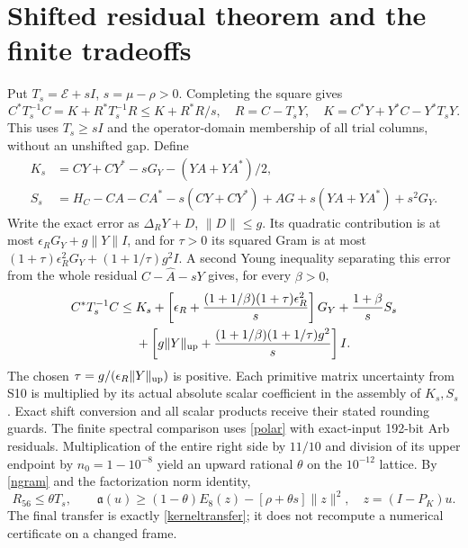 \documentclass[11pt]{article}
\numberwithin{equation}{section}
\begin{document}
\section{Shifted residual theorem and the finite tradeoffs}\label{tradeoffs}
Put $T_s=\mathcal E+sI$, $s=\mu-\rho>0$. Completing the square gives
\[
 C^*T_s^{-1}C=K+R^*T_s^{-1}R\le K+R^*R/s,
 \quad R=C-T_sY,\quad K=C^*Y+Y^*C-Y^*T_sY.
\]
This uses $T_s\ge sI$ and the operator-domain membership of all trial
columns, without an unshifted gap. Define
\begin{align*}
 K_s&=CY+CY^*-sG_Y-(YA+YA^*)/2,\\
 S_s&=H_C-CA-CA^*-s(CY+CY^*)+AG+s(YA+YA^*)+s^2G_Y.
\end{align*}
Write the exact error as $\Delta_RY+D$, $\|D\|\le g$.
Its quadratic contribution is at most
$\epsilon_RG_Y+g\|Y\|I$, and for $\tau>0$ its squared Gram is
at most $(1+\tau)\epsilon_R^2G_Y+(1+1/\tau)g^2I$.
A second Young inequality separating this error from the whole
residual $C-\widehat A-sY$ gives, for every $\beta>0$,
\begin{align}\label{enrichedcriterion}
 C^*T_s^{-1}C\le{}&K_s+
 \left[\epsilon_R+\frac{(1+1/\beta)(1+\tau)\epsilon_R^2}s\right]G_Y
 +\frac{1+\beta}sS_s\\
 &+\left[g\|Y\|_{\rm up}
       +\frac{(1+1/\beta)(1+1/\tau)g^2}s\right]I.\nonumber
\end{align}
The chosen $\tau=g/(\epsilon_R\|Y\|_{\rm up})$ is positive.
Each primitive matrix uncertainty from S10 is multiplied by its
actual absolute scalar coefficient in the assembly of $K_s,S_s$.
Exact shift conversion and all scalar products receive their stated
rounding guards. The finite spectral comparison uses \eqref{polar}
with exact-input 192-bit Arb residuals. Multiplication of the entire
right side by $11/10$ and division of its upper endpoint by
$n_0=1-10^{-8}$ yield an upward rational $\theta$ on the $10^{-12}$
lattice. By \eqref{ngram} and the factorization norm identity,
\[
 R_{56}\le\theta T_s,\qquad
 \mathfrak a(u)\ge(1-\theta)E_8(z)-[\rho+\theta s]\|z\|^2,
 \quad z=(I-P_K)u.
\]
The final transfer is exactly \eqref{kerneltransfer}; it does not
recompute a numerical certificate on a changed frame.
\end{document}
